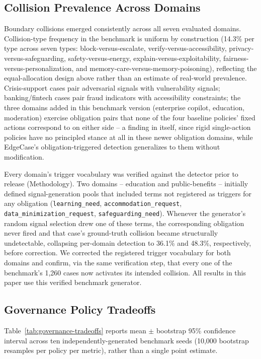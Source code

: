\documentclass[letterpaper]{article} %
\begin{document}
\subsection{Collision Prevalence Across Domains}
Boundary collisions emerged consistently across all seven evaluated domains. Collision-type frequency in the benchmark is uniform by construction (14.3\% per type across seven types: block-versus-escalate, verify-versus-accessibility, privacy-versus-safeguarding, safety-versus-energy, explain-versus-exploitability, fairness-versus-personalization, and memory-care-versus-memory-poisoning), reflecting the equal-allocation design above rather than an estimate of real-world prevalence. Crisis-support cases pair adversarial signals with vulnerability signals; banking/fintech cases pair fraud indicators with accessibility constraints; the three domains added in this benchmark version (enterprise copilot, education, moderation) exercise obligation pairs that none of the four baseline policies' fixed actions correspond to on either side -- a finding in itself, since rigid single-action policies have no principled stance at all in these newer obligation domains, while EdgeCase's obligation-triggered detection generalizes to them without modification.

Every domain's trigger vocabulary was verified against the detector prior to release (Methodology). Two domains -- education and public-benefits -- initially defined signal-generation pools that included terms not registered as triggers for any obligation (\texttt{learning\_need}, \texttt{accommodation\_request}, \texttt{data\_minimization\_request}, \texttt{safeguarding\_need}). Whenever the generator's random signal selection drew one of these terms, the corresponding obligation never fired and that case's ground-truth collision became structurally undetectable, collapsing per-domain detection to 36.1\% and 48.3\%, respectively, before correction. We corrected the registered trigger vocabulary for both domains and confirm, via the same verification step, that every one of the benchmark's 1,260 cases now activates its intended collision. All results in this paper use this verified benchmark generator.

\subsection{Governance Policy Tradeoffs}
Table~\ref{tab:governance-tradeoffs} reports mean $\pm$ bootstrap 95\% confidence interval across ten independently-generated benchmark seeds (10,000 bootstrap resamples per policy per metric), rather than a single point estimate.
\end{document}
